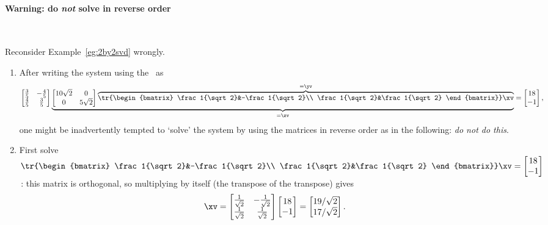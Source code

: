 \paragraph{Warning: do \emph{not} solve in reverse order} \ 
\begin{example} \label{eg:}
Reconsider Example~\ref{eg:2by2svd} wrongly.
\begin{enumerate}
\item 
After writing the system using the \svd\ as
\begin{equation*}
\begin{bmatrix} \frac35&-\frac45\\\frac45&\frac35 \end{bmatrix}
\underbrace{\begin{bmatrix} 10\sqrt2&0\\0&5\sqrt2 \end{bmatrix}
\overbrace{\tr{\begin{bmatrix} \frac1{\sqrt2}&-\frac1{\sqrt2}\\ \frac1{\sqrt2}&\frac1{\sqrt2} \end{bmatrix}}\xv}^{=\yv}}_{=\zv}=\begin{bmatrix} 18\\-1 \end{bmatrix},
\end{equation*}
one might be inadvertently tempted to `solve' the system by using the matrices in reverse order as in the following: \emph{do not do this}.

\item First solve \(\tr{\begin{bmatrix} \frac1{\sqrt2}&-\frac1{\sqrt2}\\ \frac1{\sqrt2}&\frac1{\sqrt2} \end{bmatrix}}\xv=\begin{bmatrix} 18\\-1 \end{bmatrix}\)\,:  this matrix is orthogonal, so multiplying by itself (the transpose of the transpose) gives 
\begin{equation*}
\xv=\begin{bmatrix} \frac1{\sqrt2}&-\frac1{\sqrt2}\\ \frac1{\sqrt2}&\frac1{\sqrt2} \end{bmatrix}
\begin{bmatrix} 18\\-1 \end{bmatrix}
=\begin{bmatrix} 19/\sqrt2\\17/\sqrt2 \end{bmatrix}.
\end{equation*}


\end{enumerate}
\end{example}
